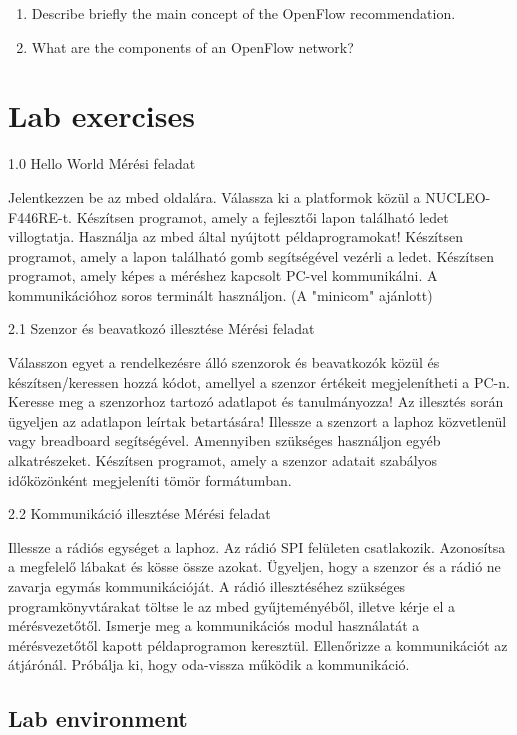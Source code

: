\documentclass[a4paper]{article}
\begin{document}
\begin{enumerate}
    \item Describe briefly the main concept of the OpenFlow recommendation.
    \item What are the components of an OpenFlow network?
\end{enumerate}

\section{Lab exercises}

1.0 Hello World
Mérési feladat

    Jelentkezzen be az mbed oldalára. Válassza ki a platformok közül a NUCLEO-F446RE-t.
    Készítsen programot, amely a fejlesztői lapon található ledet villogtatja.
    Használja az mbed által nyújtott példaprogramokat!
    Készítsen programot, amely a lapon található gomb segítségével vezérli a ledet.
    Készítsen programot, amely képes a méréshez kapcsolt PC-vel kommunikálni. A kommunikációhoz soros terminált használjon. (A "minicom" ajánlott)

2.1 Szenzor és beavatkozó illesztése
Mérési feladat

    Válasszon egyet a rendelkezésre álló szenzorok és beavatkozók közül és készítsen/keressen hozzá kódot, amellyel a szenzor értékeit megjelenítheti a PC-n.
    Keresse meg a szenzorhoz tartozó adatlapot és tanulmányozza! Az illesztés során ügyeljen az adatlapon leírtak betartására!
    Illessze a szenzort a laphoz közvetlenül vagy breadboard segítségével. Amennyiben szükséges használjon egyéb alkatrészeket.
    Készítsen programot, amely a szenzor adatait szabályos időközönként megjeleníti tömör formátumban.

2.2 Kommunikáció illesztése
Mérési feladat

    Illessze a rádiós egységet a laphoz. Az rádió SPI felületen csatlakozik. Azonosítsa a megfelelő lábakat és kösse össze azokat. Ügyeljen, hogy a szenzor és a rádió ne zavarja egymás kommunikációját.
    A rádió illesztéséhez szükséges programkönyvtárakat töltse le az mbed gyűjteményéből, illetve kérje el a mérésvezetőtől.
    Ismerje meg a kommunikációs modul használatát a mérésvezetőtől kapott példaprogramon keresztül.
    Ellenőrizze a kommunikációt az átjárónál. Próbálja ki, hogy oda-vissza működik a kommunikáció.

\subsection{Lab environment}
\end{document}
